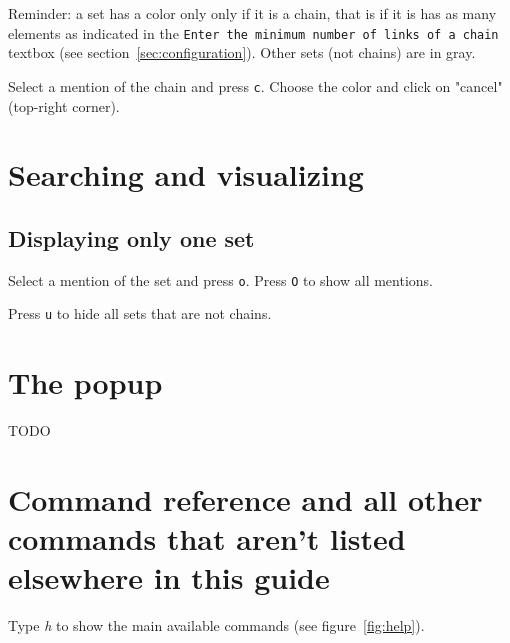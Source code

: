 \documentclass[12pt]{article}
\begin{document}
Reminder: a set has a color only only if it is a chain, that is if it is has
as many elements as indicated in the
\verb|Enter the minimum number of links of a chain| textbox (see
section~\ref{sec:configuration}).  Other sets (not chains) are in gray.

Select a mention of the chain and press \verb|c|.  Choose the color and click
on "cancel" (top-right corner).


 \section{Searching and visualizing}

 \subsection{Displaying only one set}

Select a mention of the set and press \verb|o|.  Press \verb|O| to show all
mentions.

Press \verb|u| to hide all sets that are not chains.

 \section{The popup}

TODO


 \section{Command reference and all other commands that aren't listed
 elsewhere in this guide}

Type \emph{h} to show the main available commands (see figure~\ref{fig:help}).
\end{document}
